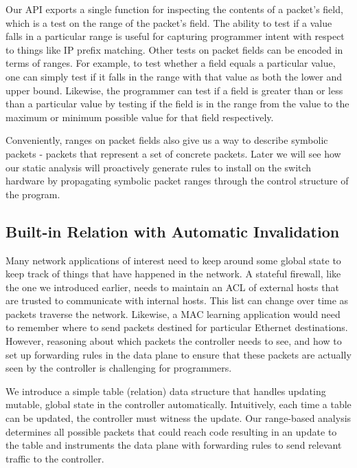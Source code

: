 \documentclass[preprint]{sigplanconf}
\begin{document}
   Our API exports a single function for inspecting the contents of a packet's field, which is a test on the range of the packet's field. The ability to test if a value falls in a particular range is useful for capturing programmer intent with respect to things like IP prefix matching. Other tests on packet fields can be encoded in terms of ranges. For example, to test whether a field equals a particular value, one can simply test if it falls in the range with that value as both the lower and upper bound. Likewise, the programmer can test if a field is greater than or less than a particular value by testing if the field is in the range from the value to the maximum or minimum possible value for that field respectively. 
   
Conveniently, ranges on packet fields also give us a way to describe symbolic packets - packets that represent a set of concrete packets. Later we will see how our static analysis will proactively generate rules to install on the switch hardware by propagating symbolic packet ranges through the control structure of the program.



     \subsection*{Built-in Relation with Automatic Invalidation}
	Many network applications of interest need to keep around some global state to keep track of things that have happened in the network. A stateful firewall, like the one we introduced earlier, needs to maintain an ACL of external hosts that are trusted to communicate with internal hosts. This list can change over time as packets traverse the network. Likewise, a MAC learning application would need to remember where to send packets destined for particular Ethernet destinations. However, reasoning about which packets the controller needs to see, and how to set up forwarding rules in the data plane to ensure that these packets are actually seen by the controller is challenging for programmers.
	
	We introduce a simple table (relation) data structure that handles updating mutable, global state in the controller automatically. Intuitively, each time a table can be updated, the controller must witness the update. Our range-based analysis determines all possible packets that could reach code resulting in an update to the table and instruments the data plane with forwarding rules to send relevant traffic to the controller.
\end{document}
